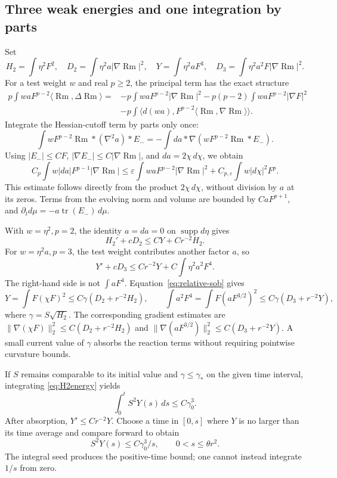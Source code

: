 \documentclass[a4paper,11pt]{article}
\numberwithin{equation}{section}
\theoremstyle{definition}
\newcommand{\Rm}{\operatorname{Rm}}
\newcommand{\tr}{\operatorname{tr}}
\begin{document}
\subsection{Three weak energies and one integration by parts}
Set
\[
H_2=\int\eta^2F^2,\quad D_2=\int\eta^2a|\nabla\Rm|^2,\quad
Y=\int\eta^2aF^3,\quad D_3=\int\eta^2a^2F|\nabla\Rm|^2.
\]
For a test weight $w$ and real $p\ge2$, the principal term has the exact structure
\begin{align*}
p\int waF^{p-2}\langle\Rm,\Delta\Rm\rangle
={}&-p\int waF^{p-2}|\nabla\Rm|^2
-p(p-2)\int waF^{p-2}|\nabla F|^2\\
&-p\int\langle d(wa),F^{p-2}\langle\Rm,\nabla\Rm\rangle\rangle.
\end{align*}
Integrate the Hessian-cutoff term by parts only once:
\[
\int wF^{p-2}\Rm*(\nabla^2a)*E_-
=-\int da*\nabla(wF^{p-2}\Rm*E_-).
\]
Using $|E_-|\le CF$, $|\nabla E_-|\le C|\nabla\Rm|$, and
$da=2\chi\,d\chi$, we obtain
\[
C_p\int w|da|F^{p-1}|\nabla\Rm|
\le\varepsilon\int waF^{p-2}|\nabla\Rm|^2
+C_{p,\varepsilon}\int w|d\chi|^2F^p.
\]
This estimate follows directly from the product $2\chi\,d\chi$, without division by $a$ at its zeros. Terms from the evolving norm and volume are bounded by $CaF^{p+1}$, and
$\partial_t d\mu=-a\tr(E_-)\,d\mu$.

With $w=\eta^2,p=2$, the identity $a=da=0$ on $\operatorname{supp}d\eta$ gives
\begin{equation}\label{eq:H2energy}
H_2'+cD_2\le CY+Cr^{-2}H_2.
\end{equation}
For $w=\eta^2a,p=3$, the test weight contributes another factor $a$, so
\begin{equation}\label{eq:H3energy}
Y'+cD_3\le Cr^{-2}Y+C\int\eta^2a^2F^4.
\end{equation}
The right-hand side is not $\int aF^4$. Equation~\eqref{eq:relative-sob} gives
\[
Y=\int F(\chi F)^2
\le C\gamma(D_2+r^{-2}H_2),\qquad
\int a^2F^4=\int F(aF^{3/2})^2
\le C\gamma(D_3+r^{-2}Y),
\]
where $\gamma=S\sqrt{H_2}$. The corresponding gradient estimates are
$\|\nabla(\chi F)\|_2^2\le C(D_2+r^{-2}H_2)$ and
$\|\nabla(aF^{3/2})\|_2^2\le C(D_3+r^{-2}Y)$.
A small current value of $\gamma$ absorbs the reaction terms without requiring pointwise curvature bounds.

If $S$ remains comparable to its initial value and $\gamma\le\gamma_*$ on the given time interval, integrating \eqref{eq:H2energy} yields
\[
\int_0^tS^2Y(s)\,ds\le C\gamma_0^3.
\]
After absorption, $Y'\le Cr^{-2}Y$. Choose a time in $[0,s]$ where $Y$ is no larger than its time average and compare forward to obtain
\begin{equation}\label{eq:positive-seed}
S^2Y(s)\le C\gamma_0^3/s,\qquad 0<s\le\theta r^2.
\end{equation}
The integral seed produces the positive-time bound; one cannot instead integrate $1/s$ from zero.
\end{document}
